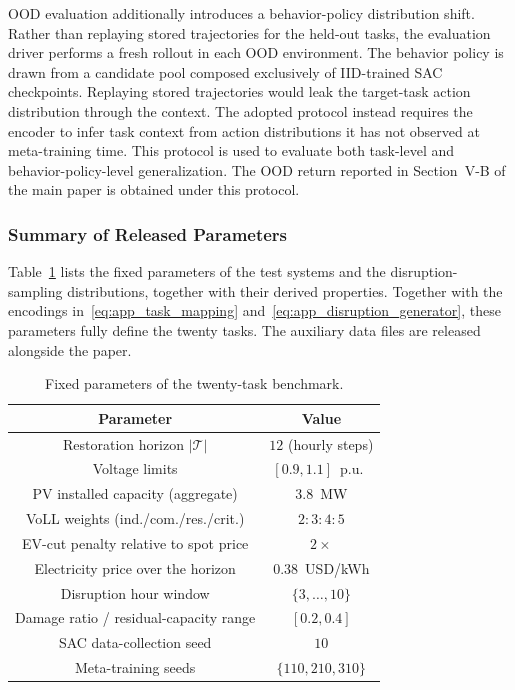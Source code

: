OOD evaluation additionally introduces a behavior-policy distribution shift. Rather than replaying stored trajectories for the held-out tasks, the evaluation driver performs a fresh rollout in each OOD environment. The behavior policy is drawn from a candidate pool composed exclusively of IID-trained SAC checkpoints. Replaying stored trajectories would leak the target-task action distribution through the context. The adopted protocol instead requires the encoder to infer task context from action distributions it has not observed at meta-training time. This protocol is used to evaluate both task-level and behavior-policy-level generalization. The OOD return reported in Section~V-B of the main paper is obtained under this protocol.

\subsubsection{Summary of Released Parameters}
\label{app:reproducibility}

Table~\ref{tab:app_benchmark_summary} lists the fixed parameters of the test systems and the disruption-sampling distributions, together with their derived properties. Together with the encodings in~\eqref{eq:app_task_mapping} and~\eqref{eq:app_disruption_generator}, these parameters fully define the twenty tasks. The auxiliary data files are released alongside the paper.

\begin{table}[!h]
\centering
\caption{Fixed parameters of the twenty-task benchmark.}
\label{tab:app_benchmark_summary}
\setlength{\tabcolsep}{4pt}
\footnotesize
\begin{tabular}{@{}cc@{}}
\toprule
Parameter & Value \\
\midrule
Restoration horizon $\lvert\mathcal{T}\rvert$ & $12$ (hourly steps) \\
Voltage limits & $[0.9,1.1]$~p.u.\ \\
PV installed capacity (aggregate) & $3.8$~MW \\
VoLL weights (ind./com./res./crit.) & $2:3:4:5$ \\
EV-cut penalty relative to spot price & $2\times$ \\
Electricity price over the horizon & $0.38$~USD/kWh \\
Disruption hour window & $\{3,\dots,10\}$ \\
Damage ratio / residual-capacity range & $[0.2,0.4]$ \\
SAC data-collection seed & $10$ \\
Meta-training seeds & $\{110,210,310\}$ \\
\bottomrule
\end{tabular}
\end{table}
